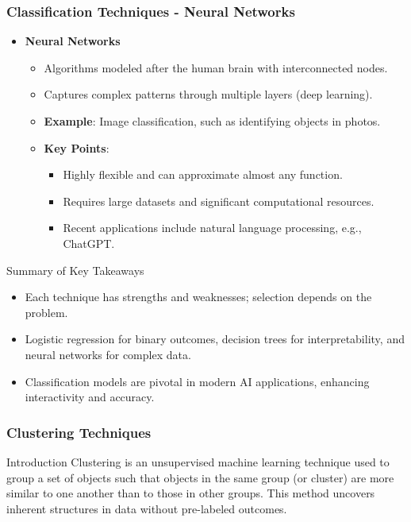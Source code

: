 \documentclass[aspectratio=169]{beamer}
\begin{document}
\begin{frame}[fragile]
    \frametitle{Classification Techniques - Neural Networks}
    \begin{itemize}
        \item \textbf{Neural Networks}
        \begin{itemize}
            \item Algorithms modeled after the human brain with interconnected nodes.
            \item Captures complex patterns through multiple layers (deep learning).
            \item \textbf{Example}: Image classification, such as identifying objects in photos.
            \item \textbf{Key Points}:
                \begin{itemize}
                    \item Highly flexible and can approximate almost any function.
                    \item Requires large datasets and significant computational resources.
                    \item Recent applications include natural language processing, e.g., ChatGPT.
                \end{itemize}
        \end{itemize}
    \end{itemize}

    \begin{block}{Summary of Key Takeaways}
        \begin{itemize}
            \item Each technique has strengths and weaknesses; selection depends on the problem.
            \item Logistic regression for binary outcomes, decision trees for interpretability, and neural networks for complex data.
            \item Classification models are pivotal in modern AI applications, enhancing interactivity and accuracy.
        \end{itemize}
    \end{block}
\end{frame}

\begin{frame}[fragile]
    \frametitle{Clustering Techniques}
    \begin{block}{Introduction}
        Clustering is an unsupervised machine learning technique used to group a set of objects such that objects in the same group (or cluster) are more similar to one another than to those in other groups. This method uncovers inherent structures in data without pre-labeled outcomes.
    \end{block}
\end{frame}
\end{document}
